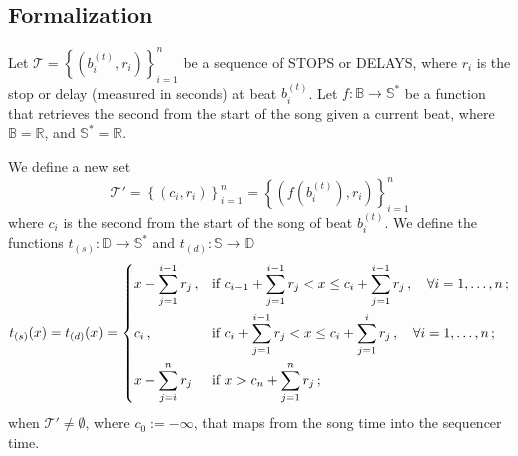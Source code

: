 \documentclass[a4paper,9pt]{article}
\begin{document}
\subsection{Formalization}


Let $ \mathcal{T} =  \left\{\left( b_i^{(t)}, r_i \right)\right\}_{i=1}^{n} $ be a sequence of STOPS or DELAYS, where $ r_i $ is the stop or delay (measured in seconds) at beat $ b_i^{(t)} $. Let $ f:\mathbb{B}\rightarrow \mathbb{S^{*}} $ be a function that retrieves the second from the start of the song given a current beat, where $ \mathbb{B} = \mathbb{R} $, and $ \mathbb{S^{*}} = \mathbb{R}$.

We define a new set 
\begin{equation}
	\mathcal{T'} = \left\{\left( c_i, r_i \right)\right\}_{i=1}^{n} = \left\{\left( f\left( b_i^{(t)}\right), r_i \right)\right\}_{i=1}^{n}
	\label{eq:tprimeset}
\end{equation}
where $ c_i $ is the second from the start of the song of beat $ b_i^{(t)} $.
We define the functions $ t_{(s)}: \mathbb{D}\rightarrow \mathbb{S^{*}} $ and $ t_{(d)}: \mathbb{S}\rightarrow \mathbb{D} $
\begin{equation}
	t_{(s)}(x) = t_{(d)}(x) = \begin{dcases}
		x - \sum_{j=1}^{i-1}r_j\,, & \text{if $ c_{i-1} + \sum_{j=1}^{i-1}r_j < x \leq c_i + \sum_{j=1}^{i-1}r_j\,, \quad \forall i=1,\dots,n$}\,;\\
		c_i\,, & \text{if $ c_i + \sum_{j=1}^{i-1}r_j < x \leq c_i + \sum_{j=1}^i r_j\,,\quad \forall i=1,\dots,n $}\,;\\
		x - \sum_{j=i}^n r_j & \text{if $ x > c_n + \sum_{j=1}^n r_j $}\,; 
	\end{dcases}
	\label{eq:t}
\end{equation}
when $ \mathcal{T'} \neq \emptyset $, where $ c_0 := -\infty $,  that maps from the song time into the sequencer time. 
\end{document}
